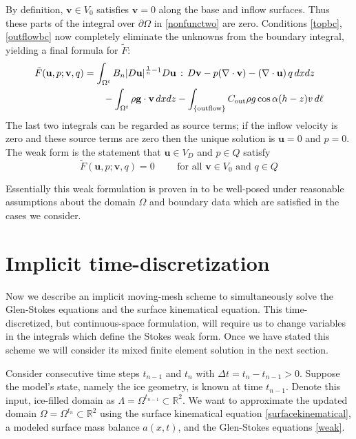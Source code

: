 \documentclass[letterpaper,final,12pt,reqno]{amsart}
\newcommand{\RR}{\mathbb{R}}
\newcommand{\bu}{\mathbf{u}}
\newcommand{\bv}{\mathbf{v}}
\begin{document}
By definition, $\bv\in V_0$ satisfies $\bv=0$ along the base and inflow surfaces.  Thus these parts of the integral over $\partial\Omega$ in \eqref{nonfunctwo} are zero.  Conditions \eqref{topbc}, \eqref{outflowbc} now completely eliminate the unknowns from the boundary integral, yielding a final formula for $\tilde F$:
\begin{align}
\tilde F(\bu,p;\bv,q) &= \int_{\Omega^t} B_n |D\bu|^{\frac{1}{n} - 1} D\bu\,:\,D\bv - p (\nabla \cdot \bv) - \left(\nabla \cdot \bu\right) q \,dx dz \label{defineF} \\
    &\qquad  - \int_{\Omega^t} \rho \mathbf{g} \cdot \bv \,dx dz - \int_{\{\text{outflow}\}} C_{\text{out}} \rho g \cos\alpha (h-z) v \,d\ell \notag
\end{align}
The last two integrals can be regarded as source terms; if the inflow velocity is zero and these source terms are zero then the unique solution is $\bu=0$ and $p=0$.  The weak form is the statement that $\bu\in V_D$ and $p\in Q$ satisfy
\begin{equation}
\tilde F(\bu,p;\bv,q) = 0 \qquad \text{ for all } \bv\in V_0 \text{ and } q\in Q  \label{weak}
\end{equation}

Essentially this weak formulation is proven in \cite[Theorem 3.8]{JouvetRappaz2011} to be well-posed under reasonable assumptions about the domain $\Omega$ and boundary data which are satisfied in the cases we consider.


\section{Implicit time-discretization} \label{sec:implicitstep}

Now we describe an implicit moving-mesh scheme to simultaneously solve the Glen-Stokes equations and the surface kinematical equation.  This time-discretized, but continuous-space formulation, will require us to change variables in the integrals which define the Stokes weak form.  Once we have stated this scheme we will consider its mixed finite element solution in the next section.

Consider consecutive time steps $t_{n-1}$ and $t_n$ with $\Delta t = t_n - t_{n-1} > 0$.  Suppose the model's state, namely the ice geometry, is known at time $t_{n-1}$.  Denote this input, ice-filled domain as $\Lambda = \Omega^{t_{n-1}} \subset \RR^2$.  We want to approximate the updated domain $\Omega = \Omega^{t_n} \subset \RR^2$ using the surface kinematical equation \eqref{surfacekinematical}, a modeled surface mass balance $a(x,t)$, and the Glen-Stokes equations \eqref{weak}.
\end{document}

